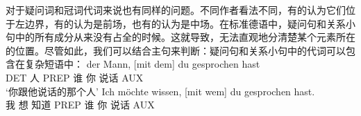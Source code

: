 对于疑问词和冠词代词来说也有同样的问题。不同作者看法不同，有的认为它们位于左边界，有的认为是前场，也有的认为是中场。在标准德语中，疑问句和关系小句中的所有成分从来没有占全的时候。这就导致，无法直观地分清楚某个元素所在的位置。尽管如此，我们可以结合主句来判断：疑问句和关系小句中的代词可以包含在复杂短语中：
\eal
\ex 
\gll der Mann,         [mit dem] du gesprochen hast\\
     DET 人 \spacebr{}PREP 谁 你 说话 AUX\\
\glt `你跟他说话的那个人'	 
\ex 
\gll Ich möchte wissen, [mit wem] du gesprochen hast.\\
     我 想 知道 \spacebr{}PREP 谁 你 说话 AUX\\

